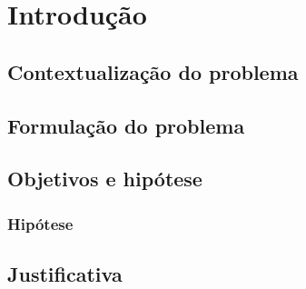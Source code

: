 \documentclass[
    12pt,                %
    openright,           %
    oneside,             %
    a4paper,             %
    english,             %
    brazil               %
]{abntex2}
\begin{document}
\vspace{\onelineskip}

\tableofcontents*
\cleardoublepage

\textual

\chapter{Introdução}
\label{cap:introducao}


\section{Contextualização do problema}
\label{sec:contexto}


\section{Formulação do problema}
\label{sec:problema}


\section{Objetivos e hipótese}


\subsection{Hipótese}
\label{subsec:hipotese}


\section{Justificativa}
\label{sec:justificativa}

\end{document}

